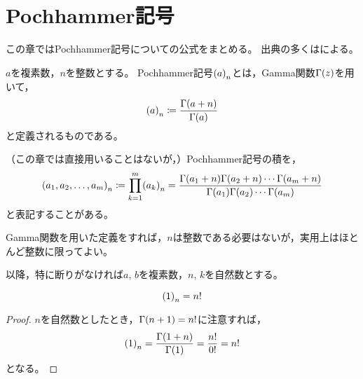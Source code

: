 \documentclass[a4paper,draft]{ltjsarticle}
\begin{document}

\section{Pochhammer記号}\label{sec:poch}
この章ではPochhammer記号についての公式をまとめる。
出典の多くは\cite{nkswtr}による。


\begin{defi}[Pochhammer記号]
    $a$を複素数，$n$を整数とする。
    Pochhammer記号$\poch{a}{n}$とは，Gamma関数$\fun{\Gamma}{z}$を用いて，
    \begin{equation}
        \poch{a}{n}\coloneqq \dfrac{\fun{\Gamma}{a+n}}{\fun{\Gamma}{a}}
    \end{equation}
    と定義されるものである。
\end{defi}

\begin{defi}[Pochhammer記号の積]
    （この章では直接用いることはないが，）Pochhammer記号の積を，
    \begin{equation}
        \poch{a_1,a_2,\dots,a_m}{n}\coloneqq \prod_{k=1}^m\poch{a_k}{n}=\frac{\fun{\Gamma}{a_1+n}\fun{\Gamma}{a_2+n}\cdots\fun{\Gamma}{a_m+n}}{\fun{\Gamma}{a_1}\fun{\Gamma}{a_2}\cdots\fun{\Gamma}{a_m}}
    \end{equation}
    と表記することがある。
\end{defi}

Gamma関数を用いた定義をすれば，$n$は整数である必要はないが，実用上はほとんど整数に限ってよい。

以降，特に断りがなければ$a$, $b$を複素数，$n$, $k$を自然数とする。



\begin{prop}
    \begin{equation}
        \poch{1}{n}=n!
    \end{equation}
    \begin{proof}
        $n$を自然数としたとき，$\fun{\Gamma}{n+1}=n!$に注意すれば，
        \begin{equation}
            \poch{1}{n}=\frac{\fun{\Gamma}{1+n}}{\fun{\Gamma}{1}}=\frac{n!}{0!}=n!
        \end{equation}
        となる。
    \end{proof}
\end{prop}
\end{document}
